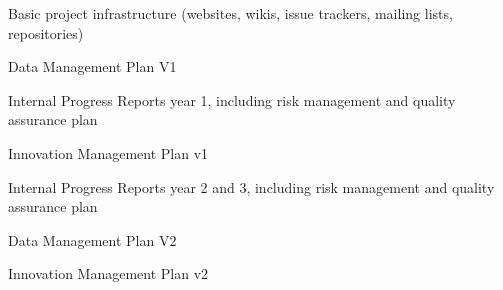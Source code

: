 \begin{workpackage}
\begin{wpdelivs}
\begin{wpdeliv}[due=1,miles=startup,id=infrastructure,dissem=PU,nature=DEC,lead=PS,issue=17, status=delivered]
  {Basic project infrastructure (websites, wikis, issue trackers, mailing lists, repositories)}
\end{wpdeliv}
\begin{wpdeliv}[due=6,miles=startup,id=data-plan1,dissem=PU,nature=R,lead=PS,issue=18, status=delivered]
  {Data Management Plan V1}
\end{wpdeliv}
\begin{wpdeliv}[due=12,miles=startup,lead=PS,id=ipr,dissem=CO,nature=R,issue=19, status=delivered]
  {Internal Progress Reports year 1, including risk management and quality assurance plan}
\end{wpdeliv}
\begin{wpdeliv}[due=18,miles=proto1,lead=PS,id=imp1,dissem=CO,nature=R,issue=20, status=delivered]
  {Innovation Management Plan v1}
\end{wpdeliv}
\begin{wpdeliv}[due=36,miles=eval,lead=PS,id=ipr2,dissem=CO,nature=R,issue=21]
  {Internal Progress Reports year 2 and 3, including risk management and quality assurance plan}
\end{wpdeliv}
\begin{wpdeliv}[due=36,miles=eval,id=data-plan2,dissem=PU,nature=R,lead=PS,issue=22]
  {Data Management Plan V2}
\end{wpdeliv}
\begin{wpdeliv}[due=45,lead=PS,miles=eval,id=imp2,dissem=CO,nature=R,issue=23]
  {Innovation Management Plan v2}
\end{wpdeliv}


\end{wpdelivs}
\end{workpackage}

